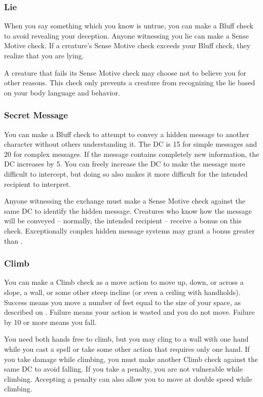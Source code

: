 \subsubsection{Lie}
When you say something which you know is untrue, you can make a Bluff check to avoid revealing your deception. Anyone witnessing you lie can make a Sense Motive check. If a creature's Sense Motive check exceeds your Bluff check, they realize that you are lying.

A creature that fails its Sense Motive check may choose not to believe you for other reasons. This check only prevents a creature from recognizing the lie based on your body language and behavior.

\subsubsection{Secret Message}
You can make a Bluff check to attempt to convey a hidden message to another character without others understanding it. The DC is 15 for simple messages and 20 for complex messages. If the message contains completely new information, the DC increases by 5. You can freely increase the DC to make the message more difficult to intercept, but doing so also makes it more difficult for the intended recipient to interpret.

Anyone witnessing the exchange must make a Sense Motive check against the same DC to identify the hidden message. Creatures who know how the message will be conveyed -- normally, the intended recipient -- receive a  bonus on this check. Exceptionally conplex hidden message systems may grant a bonus greater than .


\subsubsection{Climb}
You can make a Climb check as a move action to move up, down, or across a slope, a wall, or some other steep incline (or even a ceiling with handholds). Success means you move a number of feet equal to the size of your space, as described on . Failure means your action is wasted and you do not move. Failure by 10 or more means you fall.

You need both hands free to climb, but you may cling to a wall with one hand while you cast a spell or take some other action that requires only one hand. If you take damage while climbing, you must make another Climb check against the same DC to avoid falling. If you take a  penalty, you are not vulnerable while climbing. Accepting a  penalty can also allow you to move at double speed while climbing.

